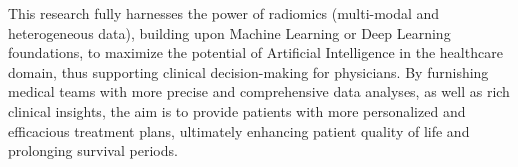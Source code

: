 \begin{englishabstract}
This research fully harnesses the power of radiomics (multi-modal and heterogeneous data), building upon Machine Learning or Deep Learning foundations, to maximize the potential of Artificial Intelligence in the healthcare domain, thus supporting clinical decision-making for physicians. By furnishing medical teams with more precise and comprehensive data analyses, as well as rich clinical insights, the aim is to provide patients with more personalized and efficacious treatment plans, ultimately enhancing patient quality of life and prolonging survival periods.

\end{englishabstract}
